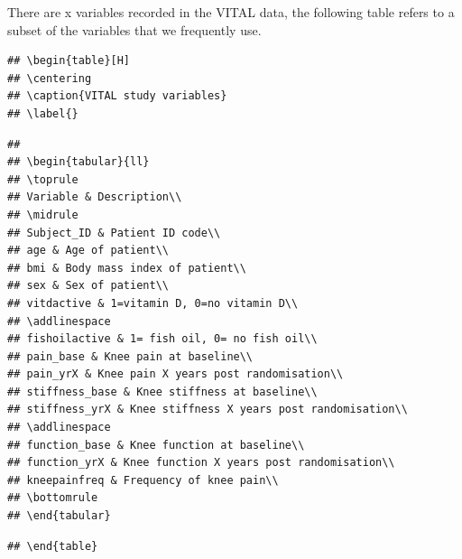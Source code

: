 \documentclass{article}
\begin{document}
There are x variables recorded in the VITAL data, the following table
refers to a subset of the variables that we frequently use.

\begin{verbatim}
## \begin{table}[H]
## \centering
## \caption{VITAL study variables}
## \label{}
\end{verbatim}

\begin{verbatim}
## 
## \begin{tabular}{ll}
## \toprule
## Variable & Description\\
## \midrule
## Subject_ID & Patient ID code\\
## age & Age of patient\\
## bmi & Body mass index of patient\\
## sex & Sex of patient\\
## vitdactive & 1=vitamin D, 0=no vitamin D\\
## \addlinespace
## fishoilactive & 1= fish oil, 0= no fish oil\\
## pain_base & Knee pain at baseline\\
## pain_yrX & Knee pain X years post randomisation\\
## stiffness_base & Knee stiffness at baseline\\
## stiffness_yrX & Knee stiffness X years post randomisation\\
## \addlinespace
## function_base & Knee function at baseline\\
## function_yrX & Knee function X years post randomisation\\
## kneepainfreq & Frequency of knee pain\\
## \bottomrule
## \end{tabular}
\end{verbatim}

\begin{verbatim}
## \end{table}
\end{verbatim}
\end{document}
